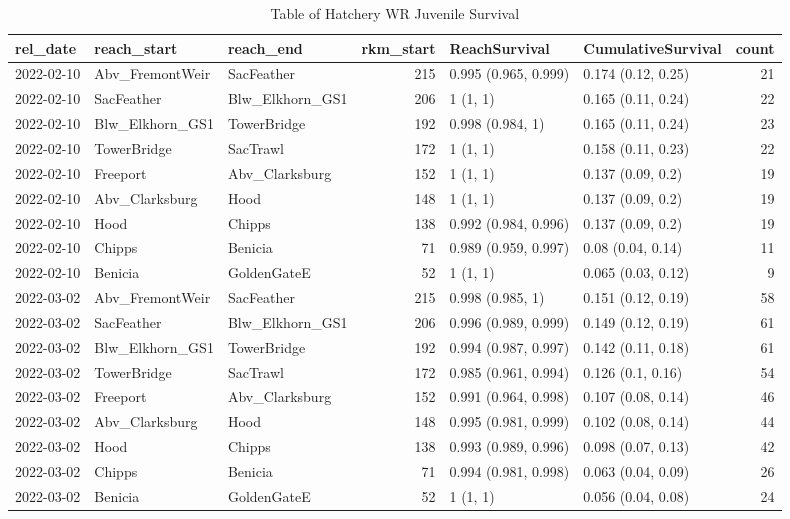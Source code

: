 \documentclass[
]{book}
\theoremstyle{definition}
\theoremstyle{definition}
\theoremstyle{definition}
\theoremstyle{definition}
\theoremstyle{remark}
\begin{document}
\begin{table}
\centering
\caption{Table of Hatchery WR Juvenile Survival}
\centering
\begin{tabular}[t]{lllrllr}
\hline
rel\_date & reach\_start & reach\_end & rkm\_start & ReachSurvival & CumulativeSurvival & count\\
\hline
2022-02-10 & Abv\_FremontWeir & SacFeather & 215 & 0.995 (0.965, 0.999) & 0.174 (0.12, 0.25) & 21\\
\hline
2022-02-10 & SacFeather & Blw\_Elkhorn\_GS1 & 206 & 1 (1, 1) & 0.165 (0.11, 0.24) & 22\\
\hline
2022-02-10 & Blw\_Elkhorn\_GS1 & TowerBridge & 192 & 0.998 (0.984, 1) & 0.165 (0.11, 0.24) & 23\\
\hline
2022-02-10 & TowerBridge & SacTrawl & 172 & 1 (1, 1) & 0.158 (0.11, 0.23) & 22\\
\hline
2022-02-10 & Freeport & Abv\_Clarksburg & 152 & 1 (1, 1) & 0.137 (0.09, 0.2) & 19\\
\hline
2022-02-10 & Abv\_Clarksburg & Hood & 148 & 1 (1, 1) & 0.137 (0.09, 0.2) & 19\\
\hline
2022-02-10 & Hood & Chipps & 138 & 0.992 (0.984, 0.996) & 0.137 (0.09, 0.2) & 19\\
\hline
2022-02-10 & Chipps & Benicia & 71 & 0.989 (0.959, 0.997) & 0.08 (0.04, 0.14) & 11\\
\hline
2022-02-10 & Benicia & GoldenGateE & 52 & 1 (1, 1) & 0.065 (0.03, 0.12) & 9\\
\hline
2022-03-02 & Abv\_FremontWeir & SacFeather & 215 & 0.998 (0.985, 1) & 0.151 (0.12, 0.19) & 58\\
\hline
2022-03-02 & SacFeather & Blw\_Elkhorn\_GS1 & 206 & 0.996 (0.989, 0.999) & 0.149 (0.12, 0.19) & 61\\
\hline
2022-03-02 & Blw\_Elkhorn\_GS1 & TowerBridge & 192 & 0.994 (0.987, 0.997) & 0.142 (0.11, 0.18) & 61\\
\hline
2022-03-02 & TowerBridge & SacTrawl & 172 & 0.985 (0.961, 0.994) & 0.126 (0.1, 0.16) & 54\\
\hline
2022-03-02 & Freeport & Abv\_Clarksburg & 152 & 0.991 (0.964, 0.998) & 0.107 (0.08, 0.14) & 46\\
\hline
2022-03-02 & Abv\_Clarksburg & Hood & 148 & 0.995 (0.981, 0.999) & 0.102 (0.08, 0.14) & 44\\
\hline
2022-03-02 & Hood & Chipps & 138 & 0.993 (0.989, 0.996) & 0.098 (0.07, 0.13) & 42\\
\hline
2022-03-02 & Chipps & Benicia & 71 & 0.994 (0.981, 0.998) & 0.063 (0.04, 0.09) & 26\\
\hline
2022-03-02 & Benicia & GoldenGateE & 52 & 1 (1, 1) & 0.056 (0.04, 0.08) & 24\\
\hline
\end{tabular}
\end{table}
\end{document}
